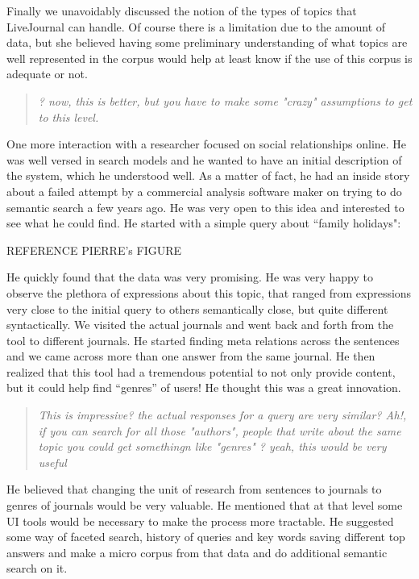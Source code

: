 \documentclass{sigchi}
\begin{document}
Finally we unavoidably discussed the notion of the types of topics that LiveJournal can handle. Of course there is a limitation due to the amount of data, but she believed having some preliminary understanding of what topics are well represented in the corpus would help at least know if the use of this corpus is adequate or not.

\begin{quote}
{\em
? now, this is better, but you have to make some "crazy" assumptions to get to this level.
}\end{quote}

One more interaction with a researcher focused on social relationships online. He was well versed in search models and he wanted to have an initial description of the system, which he understood well. As a matter of fact, he had an inside story about a failed attempt by a commercial analysis software maker on trying to do semantic search a few years ago. He was very open to this idea and interested to see what he could find. He started with a simple query about ``family holidays":

REFERENCE PIERRE's FIGURE

He quickly found that the data was very promising. He was very happy to observe the plethora of expressions about this topic, that ranged from expressions very close to the initial query to others semantically close, but quite different syntactically. We visited the actual journals and went back and forth from the tool to different journals. He started finding meta relations across the sentences and we came across more than one answer from the same journal. He then realized that this tool had a tremendous potential to not only provide content, but it could help find ``genres'' of users! He thought this was a great innovation. 

\begin{quote}
{\em
This is impressive? the actual responses for a query are very similar? Ah!, if you can search for all those "authors", people that write about the same topic you could get somethingn like "genres" ? yeah, this would be very useful
}\end{quote}

He believed that changing the unit of research from sentences to journals to genres of journals would be very valuable. He mentioned that at that level some UI tools would be necessary to make the process more tractable. He suggested some way of faceted search, history of queries and key words saving different top answers and make a micro corpus from that data and do additional semantic search on it.
\end{document}
